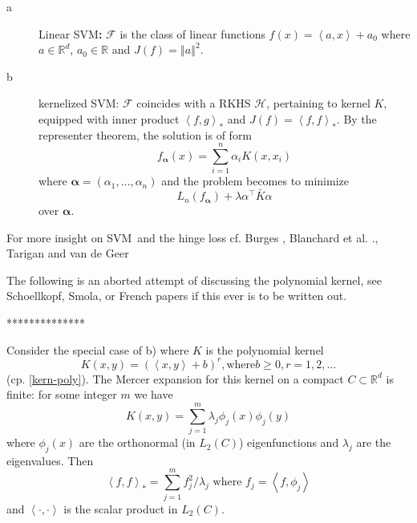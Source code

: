 \documentclass[11pt,twoside]{article}%
\theoremstyle{change}
\newenvironment{quote-env}{\begin{quote}\sffamily }{\end{quote}}
\newenvironment{mycomments-env}[1][Mycomments]{\textbf{#1.} \begin{quote-env} }{ \end{quote-env}  \ \rule{0.5em}{0.5em}}
\begin{document}
\begin{description}
\item[a] Linear SVM\textbf{: }$\mathcal{F}$ is the class of linear functions
$f(x)=\left\langle a,x\right\rangle +a_{0}$ where $a\in\mathbb{R}^{d}$,
$a_{0}\in\mathbb{R}$ and $J(f)=\left\Vert a\right\Vert ^{2}$.

\item[b] kernelized SVM: $\mathcal{F}$ coincides with a RKHS $\mathcal{H}$,
pertaining to kernel $K$, equipped with inner product $\left\langle
f,g\right\rangle _{\ast}$ and $J(f)=\left\langle f,f\right\rangle _{\ast}$. By
the representer theorem, the solution is of form
\[
f_{\mathbf{\alpha}}(x)=\sum_{i=1}^{n}\alpha_{i}K\left(  x,x_{i}\right)
\]
where $\mathbf{\alpha}=(\alpha_{1},\ldots,\alpha_{n})$ and the problem becomes
to minimize
\[
L_{n}(f_{\mathbf{\alpha}})+\lambda\alpha^{\top}\bar{K}\alpha
\]
over $\mathbf{\alpha}$.
\end{description}

For more insight on SVM\ and the hinge loss cf. Burges \cite{Burg}, Blanchard
et al. \cite{blanchard-massart-svm}., Tarigan and van de Geer
\cite{Tarig-van-deGeer}%

\begin{mycomments}%


\begin{mycomments-env}
The following is an aborted attempt of discussing the polynomial kernel, see
Schoellkopf, Smola, or French papers if this ever is to be written out.

**************

Consider the special case of b) where $K$ is the polynomial kernel
\[
K(x,y)=\left(  \left\langle x,y\right\rangle +b\right)  ^{r},\text{where
}b\geq0,r=1,2,\ldots
\]
(cp. \ref{kern-poly}). The Mercer expansion for this kernel on a compact
$C\subset\mathbb{R}^{d}$ is finite: for some integer $m$ we have
\[
K(x,y)=\sum_{j=1}^{m}\lambda_{j}\phi_{j}(x)\phi_{j}(y)
\]
where $\phi_{j}(x)$ are the orthonormal (in $L_{2}(C)$) eigenfunctions and
$\lambda_{j}$ are the eigenvalues. Then
\[
\left\langle f,f\right\rangle _{\ast}=\sum_{j=1}^{m}f_{j}^{2}/\lambda
_{j}\text{ where }f_{j}=\left\langle f,\phi_{j}\right\rangle
\]
and $\left\langle \cdot,\cdot\right\rangle $ is the scalar product in
$L_{2}(C)$.
\end{mycomments-env}%

\end{mycomments}%
\end{document}
